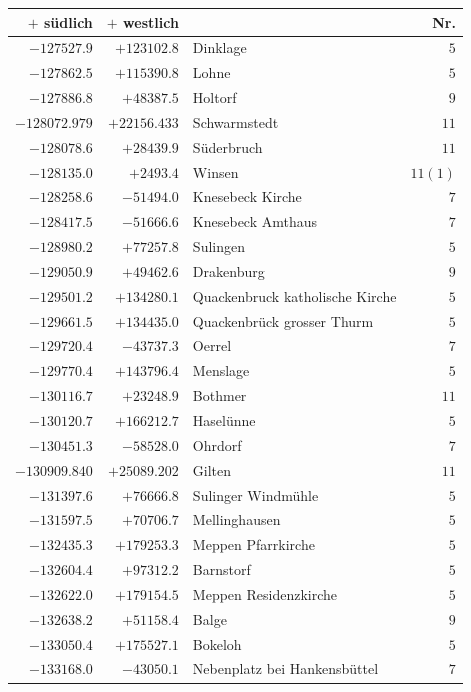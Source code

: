 \clearpage{}%
\begin{center}\begingroup\fontsize{8}{9}\selectfont
\setlength{\tabcolsep}{4pt}
\begin{tabular}{r|r|p{170pt}|r}\hline
\(+\) südlich&\(+\) westlich&&Nr.\\\hline
\(-127527.9\)&\(+123102.8\)&Dinklage&\(5\)\\
\(-127862.5\)&\(+115390.8\)&Lohne&\(5\)\\
\(-127886.8\)&\(+48387.5\)&Holtorf&\(9\)\\
\(-128072.979\)&\(+22156.433\)&Schwarmstedt&\(11\)\\
\(-128078.6\)&\(+28439.9\)&Süderbruch&\(11\)\\
\(-128135.0\)&\(+2493.4\)&Winsen&\(11 (1)\)\\
\(-128258.6\)&\(-51494.0\)&Knesebeck Kirche&\(7\)\\
\(-128417.5\)&\(-51666.6\)&Knesebeck Amthaus&\(7\)\\
\(-128980.2\)&\(+77257.8\)&Sulingen&\(5\)\\
\(-129050.9\)&\(+49462.6\)&Drakenburg&\(9\)\\
\(-129501.2\)&\(+134280.1\)&Quackenbruck katholische Kirche&\(5\)\\
\(-129661.5\)&\(+134435.0\)&Quackenbrück grosser Thurm&\(5\)\\
\(-129720.4\)&\(-43737.3\)&Oerrel&\(7\)\\
\(-129770.4\)&\(+143796.4\)&Menslage&\(5\)\\
\(-130116.7\)&\(+23248.9\)&Bothmer&\(11\)\\
\(-130120.7\)&\(+166212.7\)&Haselünne&\(5\)\\
\(-130451.3\)&\(-58528.0\)&Ohrdorf&\(7\)\\
\(-130909.840\)&\(+25089.202\)&Gilten&\(11\)\\
\(-131397.6\)&\(+76666.8\)&Sulinger Windmühle&\(5\)\\
\(-131597.5\)&\(+70706.7\)&Mellinghausen&\(5\)\\
\(-132435.3\)&\(+179253.3\)&Meppen Pfarrkirche&\(5\)\\
\(-132604.4\)&\(+97312.2\)&Barnstorf&\(5\)\\
\(-132622.0\)&\(+179154.5\)&Meppen Residenzkirche&\(5\)\\
\(-132638.2\)&\(+51158.4\)&Balge&\(9\)\\
\(-133050.4\)&\(+175527.1\)&Bokeloh&\(5\)\\
\(-133168.0\)&\(-43050.1\)&Nebenplatz bei Hankensbüttel&\(7\)\\

\end{tabular}
\end{center}
